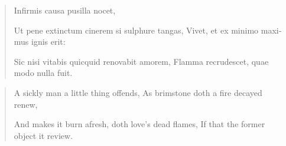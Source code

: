 \begin{latin}
\begin{verse}
Infirmis causa pusilla nocet,

Ut pene extinctum cinerem si sulphure tangas,
Vivet, et ex minimo maximus ignis erit:

Sic nisi vitabis quicquid renovabit amorem,
Flamma recrudescet, quae modo nulla fuit.
\end{verse}
\end{latin}
\translationrule%
\begin{verse}%
A sickly man a little thing offends,
As brimstone doth a fire decayed renew,

And makes it burn afresh, doth love's dead flames,
If that the former object it review.
\end{verse}%


